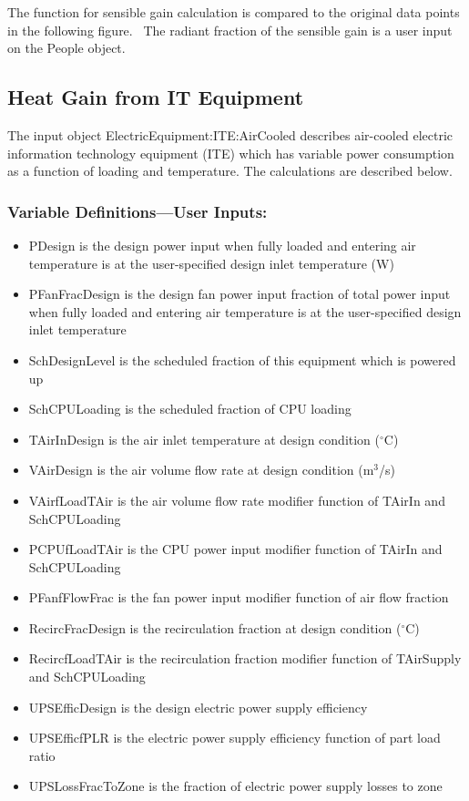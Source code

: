 The function for sensible gain calculation is compared to the original data points in the following figure.~ The radiant fraction of the sensible gain is a user input on the People object.

\subsection{Heat Gain from IT Equipment}\label{heat-gain-from-it-equipment}

The input object ElectricEquipment:ITE:AirCooled describes air-cooled electric information technology equipment (ITE) which has variable power consumption as a function of loading and temperature. The calculations are described below.

\subsubsection{Variable Definitions---User Inputs:}\label{variable-definitions-user-inputs}

\begin{itemize}
\tightlist
\item
  PDesign is the design power input when fully loaded and entering air temperature is at the user-specified design inlet temperature (W)
\item
  PFanFracDesign is the design fan power input fraction of total power input when fully loaded and entering air temperature is at the user-specified design inlet temperature
\item
  SchDesignLevel is the scheduled fraction of this equipment which is powered up
\item
  SchCPULoading is the scheduled fraction of CPU loading
\item
  TAirInDesign is the air inlet temperature at design condition ($^\circ$C)
\item
  VAirDesign is the air volume flow rate at design condition (m$^3$/s)
\item
  VAirfLoadTAir is the air volume flow rate modifier function of TAirIn and SchCPULoading
\item
  PCPUfLoadTAir is the CPU power input modifier function of TAirIn and SchCPULoading
\item
  PFanfFlowFrac is the fan power input modifier function of air flow fraction
\item
  RecircFracDesign is the recirculation fraction at design condition ($^\circ$C)
\item
  RecircfLoadTAir is the recirculation fraction modifier function of TAirSupply and SchCPULoading
\item
  UPSEfficDesign is the design electric power supply efficiency
\item
  UPSEfficfPLR is the electric power supply efficiency function of part load ratio
\item
  UPSLossFracToZone is the fraction of electric power supply losses to zone
\end{itemize}

